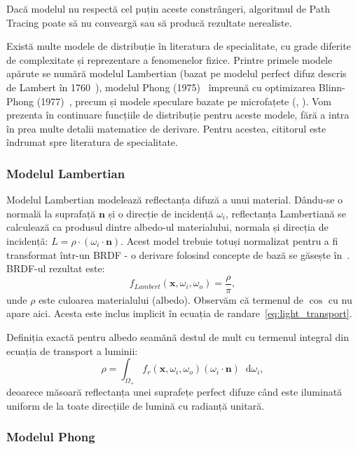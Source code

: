 \documentclass[12pt,a4paper]{report}
\newcommand*\diff{\mathop{}\!\mathrm{d}}
\numberwithin{equation}{section} %
\begin{document}
Dacă modelul nu respectă cel puțin aceste constrângeri, algoritmul de Path Tracing
poate să nu conveargă sau să producă rezultate nerealiste.

Există multe modele de distribuție în literatura de specialitate, cu grade diferite de complexitate și
reprezentare a fenomenelor fizice. Printre primele modele apărute se numără
modelul Lambertian (bazat pe modelul perfect difuz descris de Lambert în 1760~\cite{Lambert}),
modelul Phong (1975)~\cite{Phong} împreună cu optimizarea Blinn-Phong (1977)~\cite{BlinnPhong},
precum și modele speculare bazate pe microfațete (\cite{TorranceOld}, \cite{CookTorrance}).
Vom prezenta în continuare funcțiile de distribuție pentru aceste modele, fără a intra
în prea multe detalii matematice de derivare. Pentru acestea, cititorul este îndrumat
spre literatura de specialitate.

\subsubsection*{Modelul Lambertian}

Modelul Lambertian modelează reflectanța difuză a unui material. Dându-se o normală
la suprafață $\mathbf{n}$ și o direcție de incidență $\omega_i$, reflectanța Lambertiană
se calculează ca produsul dintre albedo-ul materialului, normala și direcția de incidență:
$L = \rho \cdot (\omega_i \cdot \mathbf{n})$. Acest model trebuie totuși normalizat pentru
a fi transformat într-un BRDF - o derivare folosind concepte de bază se găsește în~\cite{LambertBRDF}.
BRDF-ul rezultat este:
\begin{equation}\label{eq:lambert}
	f_{Lambert}(\mathbf{x}, \omega_i, \omega_o) = \frac{\rho}{\pi},
\end{equation}
unde $\rho$ este culoarea materialului (albedo). Observăm că termenul de $\cos$ cu
nu apare aici. Acesta este inclus implicit în ecuația de randare~\ref{eq:light_transport}.

Definiția exactă pentru albedo
seamănă destul de mult cu termenul integral din ecuația de transport a luminii:
\begin{equation}
	\rho = \int_{\Omega_+} f_r(\mathbf{x}, \omega_i, \omega_o) (\omega_i \cdot \mathbf{n}) \diff \omega_i,
\end{equation}
deoarece măsoară reflectanța unei suprafețe perfect difuze când este iluminată
uniform de la toate direcțiile de lumină cu radianță unitară.

\subsubsection*{Modelul Phong}
\end{document}
